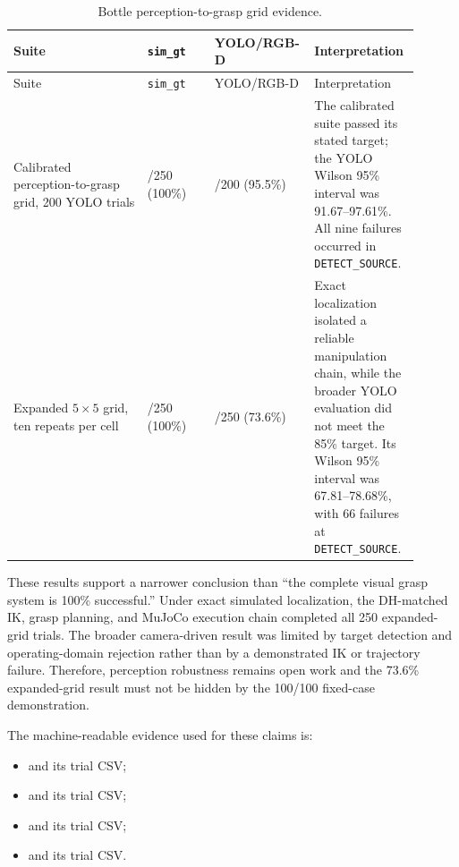 \begin{longtable}{@{}
>{\raggedright\arraybackslash}p{0.32\linewidth}
>{\raggedright\arraybackslash}p{0.16\linewidth}
>{\raggedright\arraybackslash}p{0.17\linewidth}
>{\raggedright\arraybackslash}p{0.25\linewidth}@{}}
\caption{Bottle perception-to-grasp grid evidence.}
\label{tab:backend-grid-benchmark}\\
\toprule
Suite & \texttt{sim\_gt} & YOLO/RGB-D & Interpretation \\
\midrule
\endfirsthead
\toprule
Suite & \texttt{sim\_gt} & YOLO/RGB-D & Interpretation \\
\midrule
\endhead
\bottomrule
\endfoot
Calibrated perception-to-grasp grid, 200 YOLO trials &
250/250 (100\%) & 191/200 (95.5\%) &
The calibrated suite passed its stated target; the YOLO Wilson 95\% interval
was 91.67--97.61\%. All nine failures occurred in
\texttt{DETECT\_SOURCE}. \\
Expanded $5\times5$ grid, ten repeats per cell &
250/250 (100\%) & 184/250 (73.6\%) &
Exact localization isolated a reliable manipulation chain, while the broader
YOLO evaluation did not meet the 85\% target. Its Wilson 95\% interval was
67.81--78.68\%, with 66 failures at \texttt{DETECT\_SOURCE}. \\
\end{longtable}

These results support a narrower conclusion than ``the complete visual grasp
system is 100\% successful.'' Under exact simulated localization, the
DH-matched IK, grasp planning, and MuJoCo execution chain completed all 250
expanded-grid trials. The broader camera-driven result was limited by target
detection and operating-domain rejection rather than by a demonstrated IK or
trajectory failure. Therefore, perception robustness remains open work and
the 73.6\% expanded-grid result must not be hidden by the 100/100 fixed-case
demonstration.

The machine-readable evidence used for these claims is:

\begin{itemize}
\item {}
      and its trial CSV;
\item {}
      and its trial CSV;
\item {}
      and its trial CSV;
\item {}
      and its trial CSV.
\end{itemize}

